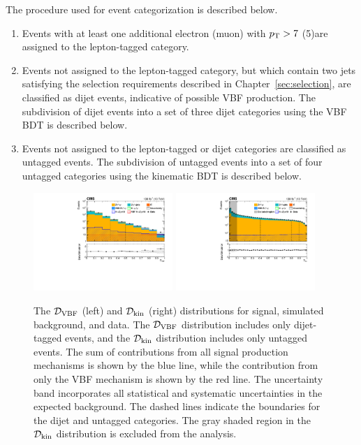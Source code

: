 The procedure used for event categorization is described below. 

\begin{enumerate}
  \item Events with at least one additional electron (muon) with $p_{\mathrm{T}}>7$ (5)\GeV are assigned to 
	  the lepton-tagged category.
  \item Events not assigned to the lepton-tagged category, but which contain two jets satisfying the 
	  selection requirements described in Chapter~\ref{sec:selection}, are classified 
	  as dijet events, indicative of possible VBF production. 
	  The subdivision of dijet events into a set of three dijet categories using the VBF BDT is described below.
  \item Events not assigned to the lepton-tagged or dijet categories are classified as untagged events.
	The subdivision of untagged events into a set of four untagged categories using the kinematic BDT is described below.
\end{enumerate}

\begin{figure}[tbp!]
\centering
\includegraphics[width=0.47\textwidth]{fig/cat/Figure_002-a.pdf}
\includegraphics[width=0.47\textwidth]{fig/cat/Figure_002-b.pdf}
 \caption{The $\mathcal{D}_{\mathrm{VBF}}$ (left) and $\mathcal{D_{\mathrm{kin}}}$ (right) distributions for signal, simulated background, and data. 
	  The $\mathcal{D}_{\mathrm{VBF}}$ distribution includes
	  only dijet-tagged events, and the $\mathcal{D_{\mathrm{kin}}}$ distribution includes only untagged events. The sum of contributions from all signal production mechanisms is shown by the blue line, while the contribution from only the VBF mechanism is shown by the red line. The uncertainty band incorporates all statistical and systematic uncertainties in the expected background. The dashed lines indicate the boundaries for the dijet and untagged categories. The gray shaded region in the $\mathcal{D_{\mathrm{kin}}}$ distribution is excluded from the analysis.\label{fig:BDT}}
\end{figure}

